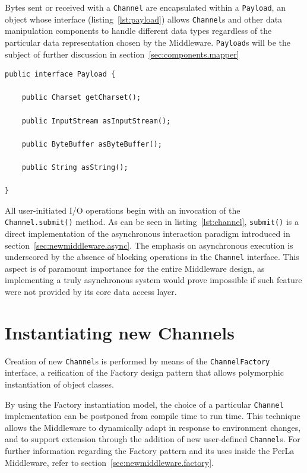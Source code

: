 Bytes sent or received with a \texttt{Channel} are encapsulated within a \texttt{Payload}, an object whose interface (listing~\ref{lst:payload}) allows \texttt{Channel}s and other data manipulation components to handle different data types regardless of the particular data representation chosen by the Middleware. \texttt{Payload}s will be the subject of further discussion in section~\ref{sec:components.mapper}

\lstset{language=Java}
\begin{lstlisting}[float,caption=The Payload interface,label={lst:payload}]
public interface Payload {

	public Charset getCharset();

	public InputStream asInputStream();

	public ByteBuffer asByteBuffer();

	public String asString();

}
\end{lstlisting}

All user-initiated I/O operations begin with an invocation of the \texttt{Channel.submit()} method. As can be seen in listing~\ref{lst:channel}, \texttt{submit()} is a direct implementation of the asynchronous interaction paradigm introduced in section~\ref{sec:newmiddleware.async}. The emphasis on asynchronous execution is underscored by the absence of blocking operations in the \texttt{Channel} interface. This aspect is of paramount importance for the entire Middleware design, as implementing a truly asynchronous system would prove impossible if such feature were not provided by its core data access layer.


\section{Instantiating new Channels}

Creation of new \texttt{Channel}s is performed by means of the  \texttt{ChannelFactory} interface, a reification of the Factory design pattern that allows polymorphic instantiation of object classes.

By using the Factory instantiation model, the choice of a particular \texttt{Channel} implementation can be postponed from compile time to run time. This technique allows the Middleware to dynamically adapt in response to environment changes, and to support extension through the addition of new user-defined \texttt{Channel}s. For further information regarding the Factory pattern and its uses inside the PerLa Middleware, refer to section~\ref{sec:newmiddleware.factory}.

